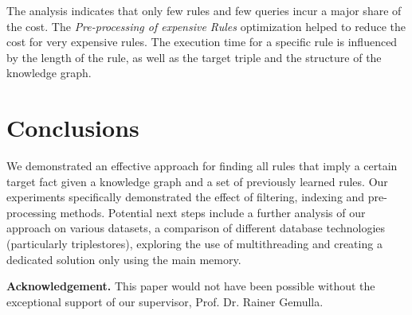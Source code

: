 \documentclass[english]{lni}
\begin{document}
The analysis indicates that only few rules and few queries incur a major share of the cost. The \textit{Pre-processing of expensive Rules} optimization helped to reduce the cost for very expensive rules. The execution time for a specific rule is influenced by the length of the rule, as well as the target triple and the structure of the knowledge graph.






\section{Conclusions}

%
%

We demonstrated an effective approach for finding all rules that imply a certain target fact given a knowledge graph and a set of previously learned rules. Our experiments specifically demonstrated the effect of filtering, indexing and pre-processing methods. Potential next steps include a further analysis of our approach on various datasets, a comparison of different database technologies (particularly triplestores), exploring the use of multithreading and creating a dedicated solution only using the main memory.

\textbf{Acknowledgement.} This paper would not have been possible without the exceptional support of our supervisor, Prof. Dr. Rainer Gemulla.

\end{document}
